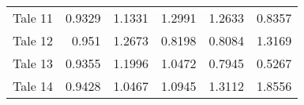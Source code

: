 \begin{table}[h]
\begin{tabular}{lrrrrr}
 Tale 11 &                        0.9329 &                      1.1331 &                        1.2991 &                          1.2633 &                         0.8357 \\
 Tale 12 &                        0.951  &                      1.2673 &                        0.8198 &                          0.8084 &                         1.3169 \\
 Tale 13 &                        0.9355 &                      1.1996 &                        1.0472 &                          0.7945 &                         0.5267 \\
 Tale 14 &                        0.9428 &                      1.0467 &                        1.0945 &                          1.3112 &                         1.8556 \\
\bottomrule
\end{tabular}
\end{table}